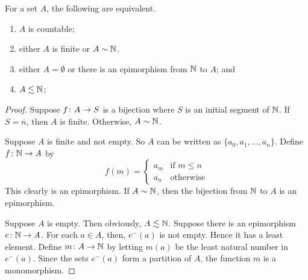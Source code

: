 \begin{theorem}
	For a set $A$, the following are equivalent.
	\begin{enumerate}
		\item $A$ is countable;
		\item either $A$ is finite or $A\sim \mathbb N$. 
		\item either $A=\emptyset$ or there is an epimorphism from $\mathbb N$ to $A$; and
		\item $A\lesssim\mathbb N$;
	\end{enumerate}
	
	\begin{proof}
		Suppose ${f}\colon{A}\to{S}$ is a bijection where $S$ is an initial segment of $\mathbb N$. If $S=\overline n$, then $A$ is finite. Otherwise, $A\sim \mathbb N$.
		
		Suppose $A$ is finite and not empty. So $A$ can be written as $\{a_0,a_1,\ldots,a_n\}$. Define ${f}\colon{\mathbb N}\to{A}$ by 
		\[f(m) = \begin{cases}
		 a_m&\text{if $m\leq n$}\\
		 a_n&\text{otherwise}
		\end{cases}
		\]
		This clearly is an epimorphism. If $A\sim\mathbb N$, then the bijection from $\mathbb N$ to $A$ is an epimorphism.
		
		Suppose $A$ is empty. Then obviously, $A\lesssim \mathbb N$. 
		Suppose there is an epimorphism ${e}\colon{\mathbb N}\to{A}$. 
		For each $a\in A$, then, $e^-(a)$ is not empty. 
		Hence it has a least element. 
		Define ${m}\colon{A}\to{\mathbb N}$ by letting $m(a)$ be the least natural number in $e^-(a)$. 
		Since the sets $e^-(a)$ form a partition of $A$, the function $m$ is a monomorphism.
		

\end{proof}
\end{theorem}

